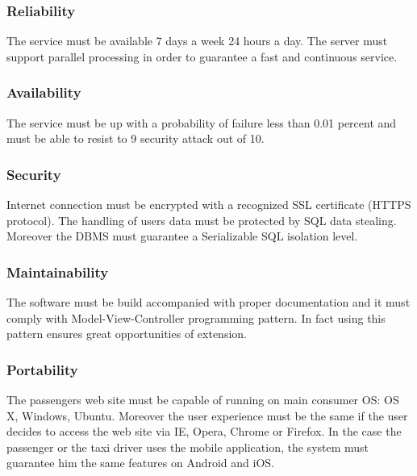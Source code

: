 \subsubsection{Reliability}
The service must be available 7 days a week 24 hours a day.  The server must support parallel processing in order to guarantee a fast and continuous service.
\subsubsection{Availability}
The service must be up with a probability of failure less than 0.01 percent and must be able to resist to 9 security attack out of 10.
\subsubsection{Security}
Internet connection must be encrypted with a recognized SSL certificate (HTTPS protocol). The handling of users data must be protected by SQL data stealing. Moreover the DBMS must guarantee a Serializable SQL isolation level.
\subsubsection{Maintainability}
The software must be build accompanied with proper documentation and it must comply with Model-View-Controller programming pattern. In fact using this pattern ensures great opportunities of extension.
\subsubsection{Portability}
The passengers web site must be capable of running on main consumer OS: OS X, Windows, Ubuntu.
Moreover the user experience must be the same if the user decides to access the web site via IE, Opera, Chrome or Firefox.
In the case the passenger or the taxi driver uses the mobile application, the system must guarantee him the same features on Android and iOS.
